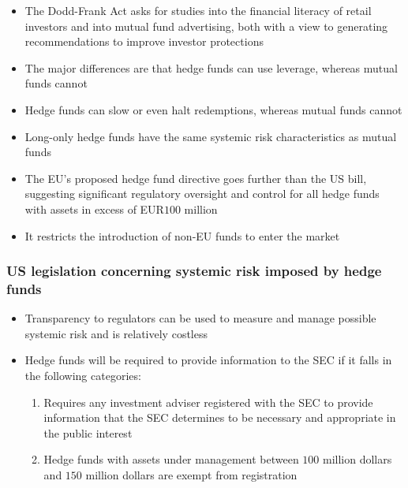 \documentclass[11pt]{beamer}
\begin{document}
\begin{frame}
\begin{itemize}
\item The Dodd-Frank Act asks for studies into the financial literacy of retail investors and into mutual fund advertising, both with a view to generating recommendations to improve investor protections
\item The major differences are that hedge funds can use leverage, whereas mutual funds cannot
\item Hedge funds can slow or even halt redemptions, whereas mutual funds cannot
\item Long-only hedge funds have the same systemic risk characteristics as mutual funds
\item The EU’s proposed hedge fund directive goes further than the US bill, suggesting significant regulatory oversight and control for all hedge funds with assets in excess of EUR$100$ million
\item It restricts the introduction of non-EU funds to enter the market
\end{itemize}
\end{frame}

\begin{frame}
\frametitle{US legislation concerning systemic risk imposed by hedge funds}
\begin{itemize}
\item Transparency to regulators can be used to measure and manage possible systemic risk and is relatively costless
\item Hedge funds will be required to provide information to the SEC if it falls in the following categories:
\begin{enumerate}
\item Requires any investment adviser registered with the SEC to provide information that the SEC determines to be necessary and appropriate in the public interest
\item Hedge funds with assets under management between $100$ million dollars and $150$ million dollars are exempt from registration
\end{enumerate}
\end{itemize}
\end{frame}
\end{document}
